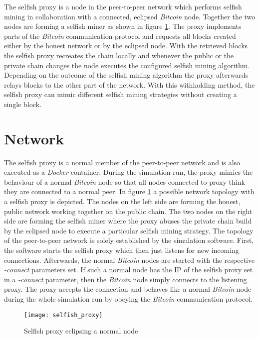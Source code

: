 The selfish proxy is a node in the peer-to-peer network which performs selfish mining in collaboration with a connected, eclipsed \textit{Bitcoin} node.
Together the two nodes are forming a selfish miner as shown in figure \ref{fig:selfish_proxy}.
The proxy implements parts of the \textit{Bitcoin} communication protocol and requests all blocks created either by the honest network or by the eclipsed node.
With the retrieved blocks the selfish proxy recreates the chain locally and whenever the public or the private chain changes the node executes the configured selfish mining algorithm.
Depending on the outcome of the selfish mining algorithm the proxy afterwards relays blocks to the other part of the network.
With this withholding method, the selfish proxy can mimic different selfish mining strategies without creating a single block.

\section{Network}

The selfish proxy is a normal member of the peer-to-peer network and is also executed as a \textit{Docker} container.
During the simulation run, the proxy mimics the behaviour of a normal \textit{Bitcoin} node so that all nodes connected to proxy think they are connected to a normal peer.
In figure \ref{fig:selfish_proxy} a possible network topology with a selfish proxy is depicted.
The nodes on the left side are forming the honest, public network working together on the public chain.
The two nodes on the right side are forming the selfish miner where the proxy abuses the private chain build by the eclipsed node to execute a particular selfish mining strategy.
The topology of the peer-to-peer network is solely established by the simulation software.
First, the software starts the selfish proxy which then just listens for new incoming connections.
Afterwards, the normal \textit{Bitcoin} nodes are started with the respective \textit{-connect} parameters set.
If such a normal node has the IP of the selfish proxy set in a \textit{-connect} parameter, then the \textit{Bitcoin} node simply connects to the listening proxy.
The proxy accepts the connection and behaves like a normal \textit{Bitcoin} node during the whole simulation run by obeying the \textit{Bitcoin} communication protocol.

\begin{figure}
	\centering
    \texttt{[image: selfish\_proxy]}
    \caption{Selfish proxy eclipsing a normal node}
    \label{fig:selfish_proxy}
\end{figure}

